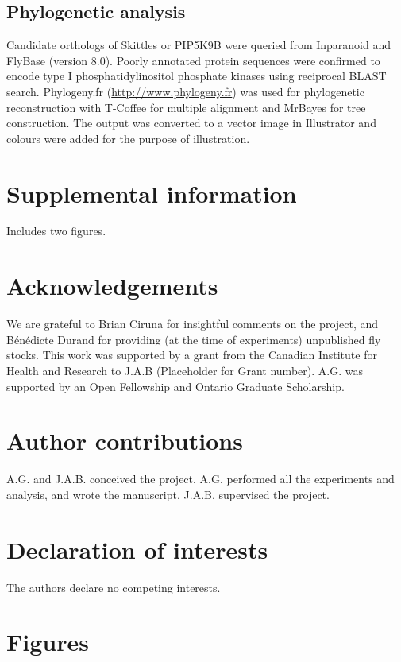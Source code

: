 \documentclass[12pt, twoside, letterpaper]{article}
\begin{document}
\begin{doublespacing}
\begin{linenumbers}
    \subsection{Phylogenetic analysis}
    Candidate orthologs of Skittles or PIP5K9B were queried
    from Inparanoid and FlyBase (version 8.0).
    Poorly annotated protein sequences were confirmed
    to encode type I phosphatidylinositol phosphate
    kinases using reciprocal BLAST search.
    Phylogeny.fr (\url{http://www.phylogeny.fr}) was used for
    phylogenetic reconstruction with T-Coffee for multiple alignment
    and MrBayes for tree construction.
    The output was converted to a vector image in Illustrator
    and colours were added for the purpose of illustration.

    \section{Supplemental information}
    Includes two figures.
    
    \section{Acknowledgements}
    We are grateful to Brian Ciruna for insightful comments on the project,
    and Bénédicte Durand for providing (at the time of experiments)
    unpublished fly stocks.
    This work was supported by a grant from the Canadian Institute for
    Health and Research to J.A.B (Placeholder for Grant number).
    A.G. was supported by an Open Fellowship and Ontario Graduate Scholarship.
    
    \section{Author contributions}
    A.G. and J.A.B. conceived the project.
    A.G. performed all the experiments and analysis, and wrote the manuscript.
    J.A.B. supervised the project.
    
    \section{Declaration of interests}
    The authors declare no competing interests.

    \section{Figures}
    

\end{linenumbers}
\end{doublespacing}
\end{document}
